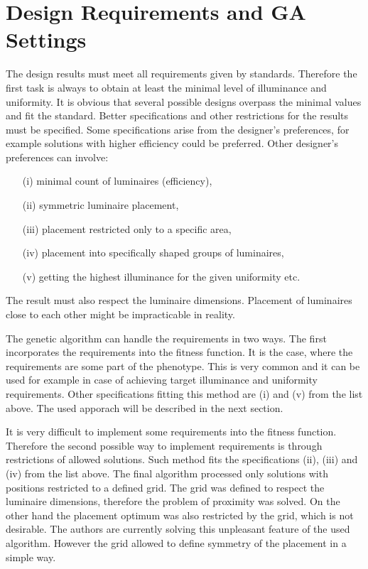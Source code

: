 \section{Design Requirements and GA Settings}
The design results must meet all requirements given by standards. Therefore the first task is always to obtain at least the minimal level of illuminance and uniformity. It is obvious that several possible designs overpass the minimal values and fit the standard. Better specifications and other restrictions for the results must be specified. Some specifications arise from the designer's preferences, for example solutions with higher efficiency could be preferred. Other designer's preferences can involve:

\begin{enumerate}
	\item[(i)] minimal count of luminaires (efficiency),
	\item[(ii)] symmetric luminaire placement,
	\item[(iii)] placement restricted only to a specific area,
	\item[(iv)] placement into specifically shaped groups of luminaires,
	\item[(v)] getting the highest illuminance for the given uniformity etc.
\end{enumerate}

The result must also respect the luminaire dimensions. Placement of luminaires close to each other might be impracticable in reality.

The genetic algorithm can handle the requirements in two ways. The first incorporates the requirements into the fitness function. It is the case, where the requirements are some part of the phenotype. This is very common and it can be used for example in case of achieving target illuminance and uniformity requirements. Other specifications fitting this method are (i) and (v) from the list above. The used apporach will be described in the next section. 

It is very difficult to implement some requirements into the fitness function. Therefore the second possible way to implement requirements is through restrictions of allowed solutions. Such method fits the specifications (ii), (iii) and (iv) from the list above. The final algorithm processed only solutions with positions restricted to a defined grid. The grid was defined to respect the luminaire dimensions, therefore the problem of proximity was solved. On the other hand the placement optimum was also restricted by the grid, which is not desirable. The authors are currently solving this unpleasant feature of the used algorithm. However the grid allowed to define symmetry of the placement in a simple way.

